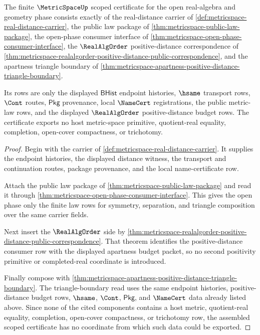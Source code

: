 \begin{theorem}
\label{thm:metricspace-real-distance-scoped-certificate}
The finite $\MetricSpaceUp$ scoped certificate for the open real-algebra and
geometry phase consists exactly of the real-distance carrier of
\autoref{def:metricspace-real-distance-carrier}, the public law package of
\autoref{thm:metricspace-public-law-package}, the open-phase consumer
interface of \autoref{thm:metricspace-open-phase-consumer-interface}, the
$\RealAlgOrder$ positive-distance correspondence of
\autoref{thm:metricspace-realalgorder-positive-distance-public-correspondence},
and the apartness triangle boundary of
\autoref{thm:metricspace-apartness-positive-distance-triangle-boundary}.

Its rows are only the displayed $\mathsf{BHist}$ endpoint histories, $\hsame$
transport rows, $\Cont$ routes, $\mathsf{Pkg}$ provenance, local $\NameCert$
registrations, the public metric-law rows, and the displayed $\RealAlgOrder$
positive-distance budget rows. The certificate exports no host metric-space
primitive, quotient-real equality, completion, open-cover compactness, or
trichotomy.
\end{theorem}
\begin{proof}
Begin with the carrier of
\autoref{def:metricspace-real-distance-carrier}. It supplies the endpoint
histories, the displayed distance witness, the transport and continuation
routes, package provenance, and the local name-certificate row.

Attach the public law package of
\autoref{thm:metricspace-public-law-package} and read it through
\autoref{thm:metricspace-open-phase-consumer-interface}. This gives the open
phase only the finite law rows for symmetry, separation, and triangle
composition over the same carrier fields.

Next insert the $\RealAlgOrder$ side by
\autoref{thm:metricspace-realalgorder-positive-distance-public-correspondence}.
That theorem identifies the positive-distance consumer row with the displayed
apartness budget packet, so no second positivity primitive or completed-real
coordinate is introduced.

Finally compose with
\autoref{thm:metricspace-apartness-positive-distance-triangle-boundary}. The
triangle-boundary read uses the same endpoint histories, positive-distance
budget rows, $\hsame$, $\Cont$, $\mathsf{Pkg}$, and $\NameCert$ data already
listed above. Since none of the cited components contains a host metric,
quotient-real equality, completion, open-cover compactness, or trichotomy row,
the assembled scoped certificate has no coordinate from which such data could
be exported.
\end{proof}

